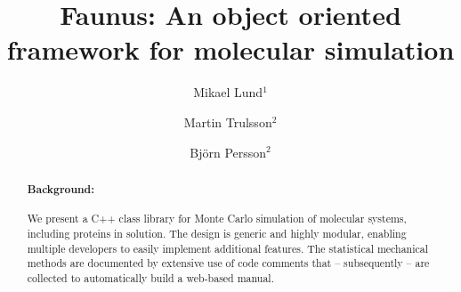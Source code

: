 \documentclass[10pt]{bmc_article}
\newenvironment{bmcformat}{\begin{raggedright}\baselineskip20pt\sloppy\setboolean{publ}{false}}{\end{raggedright}\baselineskip20pt\sloppy}
\begin{document}
\begin{bmcformat}



\title{Faunus: An object oriented framework for molecular si\-mu\-la\-tion}
 


\author{Mikael Lund\correspondingauthor$^{1}$%
\and
Martin Trulsson$^{2}$
\and
Bj\"orn Persson$^{2}$
      }
      

\address{%
    \iid(1) Institute of Organic Chemistry and Biochemistry, The Academy of Sciences of the Czech Republic, Flemingovo nam.2, CZ-16610 Prague 6, Czech Republic.
     \iid(2) Department of Theoretical Chemistry,
     University of Lund, P.O.B 124 SE-22100 Lund, Sweden.
}%
\maketitle

\begin{abstract}
        \paragraph*{Background:} We present a C++ class library for Monte Carlo simulation of molecular systems, including proteins in solution. The design is generic and highly modular, enabling multiple developers to easily implement additional features. The statistical mechanical methods are documented by extensive use of code comments that -- subsequently -- are collected to automatically build a web-based manual.

\end{abstract}
\end{bmcformat}
\end{document}
